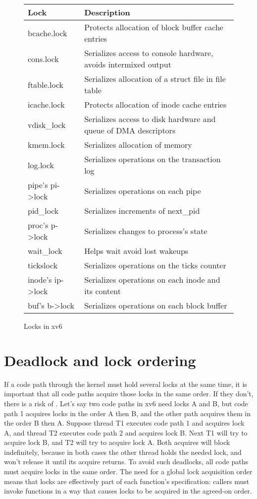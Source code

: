\begin{figure}[t]
\center
\begin{tabular}{ll}
{\bf Lock} & {\bf Description} \\
\midrule
bcache.lock & Protects allocation of block buffer cache entries \\
cons.lock & Serializes access to console hardware, avoids intermixed output \\
ftable.lock & Serializes allocation of a struct file in file table \\
icache.lock & Protects allocation of inode cache entries \\
vdisk\_lock & Serializes access to disk hardware and queue of DMA descriptors \\
kmem.lock & Serializes allocation of memory \\
log.lock & Serializes operations on the transaction log \\
pipe's pi->lock & Serializes operations on each pipe \\
pid\_lock & Serializes increments of next\_pid \\
proc's p->lock & Serializes changes to process's state \\
wait\_lock & Helps wait avoid lost wakeups \\
tickslock & Serializes operations on the ticks counter \\
inode's ip->lock & Serializes operations on each inode and its content \\
buf's b->lock & Serializes operations on each block buffer \\
\end{tabular}
\caption{Locks in xv6}
\label{fig:locktable}
\end{figure}

\section{Deadlock and lock ordering}
If a code path through the kernel must hold several locks at the same time, it is
important that all code paths acquire those locks in the same order.  If
they don't, there is a risk of .  Let's say two code paths in
xv6 need locks A and B, but code path 1 acquires locks in the order A
then B, and the other path acquires them in the order B then A.
Suppose thread T1 executes code path 1 and acquires lock A,
and thread T2 executes code path 2 and acquires lock B.
Next T1 will try to acquire lock B, and T2 will try to acquire lock A.
Both acquires will block indefinitely, because in both cases the
other thread holds the needed lock, and won't release it until
its acquire returns.
To avoid such deadlocks, all code paths must acquire
locks in the same order. The need for a global lock acquisition order
means that locks are effectively part of each function's specification: 
callers must invoke functions in a way that causes locks to be acquired
in the agreed-on order.

